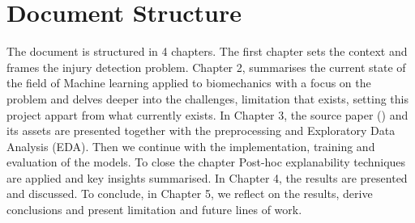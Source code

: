 \section{Document Structure}\label{sec:intro-structure}
The document is structured in 4 chapters. The first chapter sets the context and frames the injury detection problem. Chapter 2, summarises the current state of the field of Machine learning applied to biomechanics with a focus on the problem and delves deeper into the challenges, limitation that exists, setting this project appart from what currently exists. In Chapter 3, the source paper (\cite{Ferber2024}) and its assets are presented together with the preprocessing and Exploratory Data Analysis (EDA). Then we continue with the implementation, training and evaluation of the models. To close the chapter Post-hoc explanability techniques are applied and key insights summarised. In Chapter 4, the results are presented and discussed. To conclude, in Chapter 5, we reflect on the results, derive conclusions and present limitation and future lines of work.
